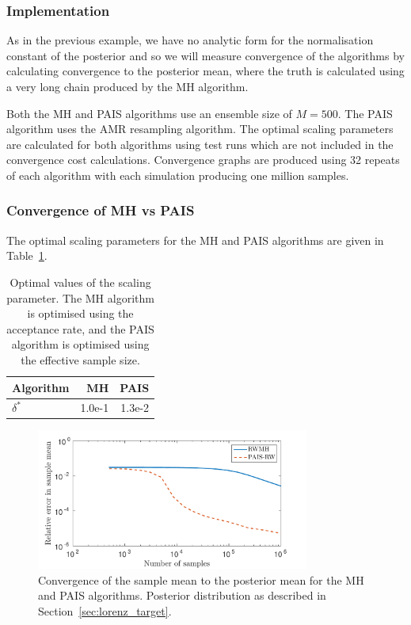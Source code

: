 \documentclass[final]{siamltex}
\begin{document}
\subsubsection{Implementation}\label{sec:lorenz_implementation}

As in the previous example, we have no analytic form for the normalisation constant of the posterior and so we will measure convergence of the algorithms by calculating convergence to the posterior mean, where the truth is calculated using a very long chain produced by the MH algorithm.

Both the MH and PAIS algorithms use an ensemble size of $M=500$. The PAIS algorithm uses the AMR resampling algorithm. The optimal scaling parameters are calculated for both algorithms using test runs which are not included in the convergence cost calculations. Convergence graphs are produced using 32 repeats of each algorithm with each simulation producing one million samples.

\subsubsection{Convergence of MH vs PAIS}\label{sec:lorenz_conv}

The optimal scaling parameters for the MH and PAIS algorithms are given in Table~\ref{table:Lorenz_opt_parameters}.

\begin{table}[!htb]
      \centering
        \begin{tabular}{|l|r|r|}
	\hline
	Algorithm	& MH & PAIS \\ \hline
	$\delta^*$	& 1.0e-1     & 1.3e-2 \\
	\hline
	\end{tabular}
	\vspace{1mm}
	\caption{Optimal values of the scaling parameter. The MH algorithm is optimised using the acceptance rate, and the PAIS algorithm is optimised using the effective sample size.}
	\label{table:Lorenz_opt_parameters}
\end{table}

\begin{figure}[htb]
\centering
\includegraphics[width=0.8\textwidth]{"figures/Lorenz_convergence"}
\caption{Convergence of the sample mean to the posterior mean for the MH and PAIS algorithms. Posterior distribution as described in Section~\ref{sec:lorenz_target}.}
\label{fig:Lorenz_convergence}
\end{figure}
\end{document}
